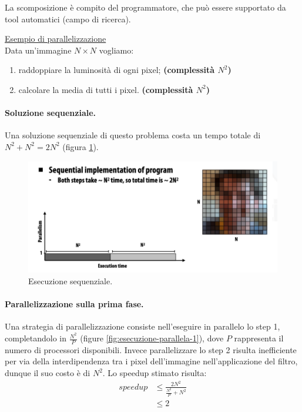 La scomposizione è compito del programmatore, che può essere supportato da tool automatici (campo di ricerca).

\underline{Esempio di parallelizzazione}
\\

Data un'immagine $N\times N$ vogliamo:
\begin{enumerate}[label=$\bullet$ \textbf{Step \arabic*:}]
    \item raddoppiare la luminosità di ogni pixel; {\color{NavyBlue}\textbf{(complessità $N^2$)}}
    \item calcolare la media di tutti i pixel. {\color{NavyBlue}\textbf{(complessità $N^2$)}}
\end{enumerate}

\paragraph{Soluzione sequenziale.} Una soluzione sequenziale di questo problema costa un tempo totale di {\color{NavyBlue}$N^2+N^2=2N^2$} (figura \ref{fig:esecuzione-sequenziale}). 
\begin{figure}[th]
	\centering
	\includegraphics[width=0.7\linewidth]{img/esecuzione-sequenziale.png}
	\caption{Esecuzione sequenziale.}
	\label{fig:esecuzione-sequenziale}
\end{figure}

\paragraph{Parallelizzazione sulla prima fase.}Una strategia di parallelizzazione consiste nell'eseguire in parallelo lo step 1, completandolo in $\frac{N^2}{P}$ (figure \ref{fig:esecuzione-parallela-1}), dove $P$ rappresenta il numero di processori disponibili. Invece parallelizzare lo step 2 risulta inefficiente  per via della interdipendenza tra i pixel dell'immagine nell'applicazione del filtro, dunque il suo costo è di $N^2$. Lo speedup stimato risulta:
\begin{align*}
    speedup &\le \frac{2N^2}{\frac{N^2}{P} + N^2}\\
    &\le 2
\end{align*}

